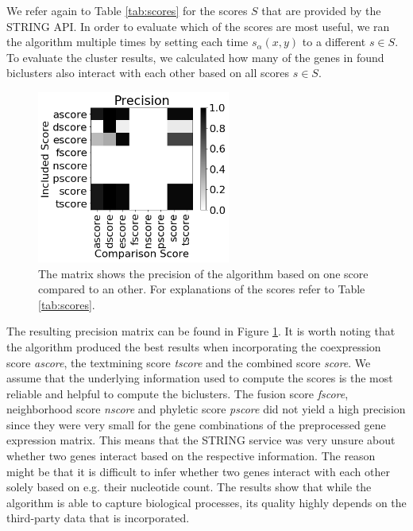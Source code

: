 \documentclass[10pt, conference, compsocconf]{IEEEtran}
\begin{document}
We refer again to Table \ref{tab:scores} for the scores $S$ that are provided by the STRING API.
In order to evaluate which of the scores are most useful, we ran the algorithm multiple times by setting each time $s_\alpha(x, y)$ to a different $s \in S$.
To evaluate the cluster results, we calculated how many of the genes in found biclusters also interact with each other based on all scores $s \in S$.
\begin{figure}[h]
\centering
\includegraphics[width=2.5in]{figures/precision_matrix.png}
\caption{The matrix shows the precision of the algorithm based on one score compared to an other. For explanations of the scores refer to Table \ref{tab:scores}.}
\label{fig:precision}
\end{figure}
The resulting precision matrix can be found in Figure \ref{fig:precision}.
It is worth noting that the algorithm produced the best results when incorporating the coexpression score \textit{ascore}, the textmining score \textit{tscore} and the combined score \textit{score}.
We assume that the underlying information used to compute the scores is the most reliable and helpful to compute the biclusters.
The fusion score \textit{fscore}, neighborhood score \textit{nscore} and phyletic score \textit{pscore} did not yield a high precision since they were very small for the gene combinations of the preprocessed gene expression matrix.
This means that the STRING service was very unsure about whether two genes interact based on the respective information.
The reason might be that it is difficult to infer whether two genes interact with each other solely based on e.g. their nucleotide count.
The results show that while the algorithm is able to capture biological processes, its quality highly depends on the third-party data that is incorporated.
\end{document}
